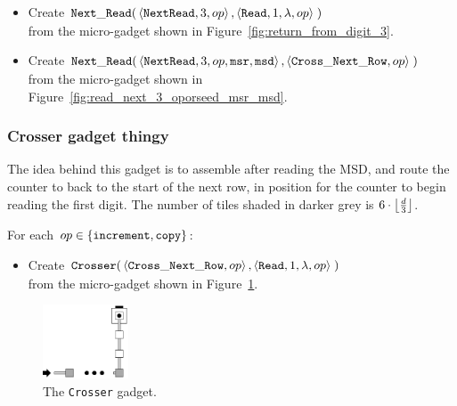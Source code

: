\begin{itemize}

    \item Create
    $\begin{aligned}[t]
        \readnext(& \left\langle {\tt NextRead}, 3,          \inc \right\rangle,
                    \left\langle {\tt Read},     1, \lambda, \inc \right\rangle \;)
    \end{aligned}$\\from the micro-gadget shown in Figure~\ref{fig:return_from_digit_3}.

    \item Create
    $\begin{aligned}[t]
        \readnext(& \left\langle {\tt NextRead}, 3,      \inc, {\tt msr}, {\tt msd} \right\rangle,
                    \left\langle {\tt Cross\_Next\_Row}, \inc \right\rangle \;)
    \end{aligned}$\\from the micro-gadget shown in Figure~\ref{fig:read_next_3_oporseed_msr_msd}.


\end{itemize}

\subsubsection{Crosser gadget thingy}

The idea behind this gadget is to assemble after reading the MSD, and route the
counter to back to the start of the next row, in position for the counter to
begin reading the first digit. The number of tiles shaded in darker grey is
$6 \cdot \floor*{\frac{d}{3}}$.

\vspace{.5cm}
For each $\inc\in \{ {\tt increment}, {\tt copy} \}$:

\begin{itemize}
    \item Create
    $\begin{aligned}[t]
        {\tt Crosser}(&\left\langle {\tt Cross\_Next\_Row}, \inc \right\rangle,
                       \left\langle {\tt Read}, 1, \lambda, \inc \right\rangle \;)
    \end{aligned}$\\from the micro-gadget shown in Figure~\ref{fig:cross_to_next_row}.
\end{itemize}

\begin{figure}[H]
    \centering
    \includegraphics[width=1in]{cross_to_next_row}
    \caption{\label{fig:cross_to_next_row} The {\tt Crosser} gadget.}
\end{figure}